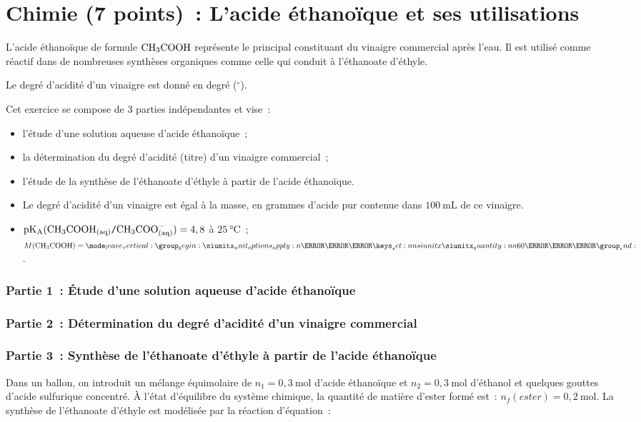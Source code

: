 \part{Chimie (7 points)~: L'acide éthanoïque et ses utilisations}
L'acide éthanoïque de formule $\ce{CH3COOH}$ représente le principal constituant
du vinaigre commercial après l'eau. Il est utilisé comme réactif dans de
nombreuses synthèses organiques comme celle qui conduit à l'éthanoate
d'éthyle.

Le degré d'acidité d'un vinaigre est donné en degré ($^{\circ}$).

Cet exercice se compose de 3 parties indépendantes et vise~:
\begin{itemize}
    \item l'étude d'une solution aqueuse d'acide éthanoïque~;
    \item la détermination du degré d'acidité (titre) d'un vinaigre commercial~;
    \item l'étude de la synthèse de l'éthanoate d'éthyle à partir de l'acide
          éthanoïque.
\end{itemize}

\begin{donnees}
    \begin{itemize}
        \item Le degré d'acidité d'un vinaigre est égal à la masse, en grammes
              d'acide pur contenue dans $\qty{100}{\mL}$ de ce vinaigre.
        \item $\mathrm{pK_{A}}
              (\ce{CH3COOH_{(aq)}}\ttslash{}\ce{CH3COO^-_{(aq)}})=4,8$ à
              $\qty{25}{\degreeCelsius}$~; \;
              $M(\ce{CH3COOH})=\qty{60}{\g\per\mol}$.
    \end{itemize}
\end{donnees}

\section*{Partie 1~: Étude d'une solution aqueuse d'acide éthanoïque}


\section*{Partie 2~: Détermination du degré d'acidité d'un vinaigre commercial}


\section*{Partie 3~: Synthèse de l'éthanoate d'éthyle à partir de l'acide
éthanoïque}
Dans un ballon, on introduit un mélange équimolaire de $n_{1}=0,3 \mathrm{~mol}$ d'acide éthanoïque et $n_{2}=0,3 \mathrm{~mol}$ d'éthanol et quelques gouttes d'acide sulfurique concentré. À l'état d'équilibre du système chimique, la quantité de matière d'ester formé est~: $n_{f}(e s t e r)=0,2 \mathrm{~mol}$. La synthèse de l'éthanoate d'éthyle est modélisée par la réaction d'équation~:


